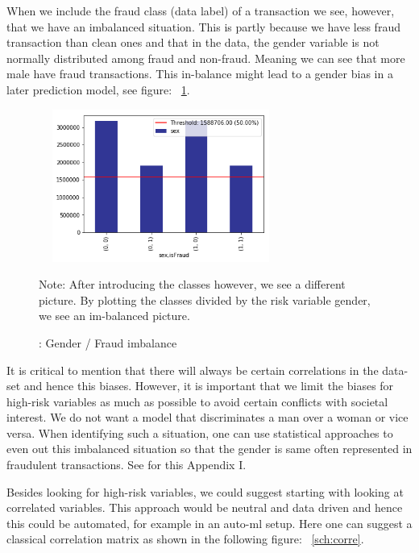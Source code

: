 \documentclass[jou,apacite]{apa6}
\begin{document}
When we include the fraud class (data label) of a transaction we see, however, that we have an imbalanced situation. This is partly because we have less fraud transaction than clean ones and that in the data, the gender variable is not normally distributed among fraud and non-fraud. Meaning we can see that more male have fraud transactions. This in-balance might lead to a gender bias in a later prediction model, see figure: ~\ref{sch:genderim}.

\begin{figure}[htb!]
  \includegraphics[width=8cm, height=5cm]{rebalancegenderfraud.png}
  \caption{: Gender / Fraud imbalance}
  \medskip %
  \begin{minipage}{0.45\textwidth} %
  {\footnotesize Note: After introducing the classes however, we see a different  picture. By plotting the classes divided by the risk variable gender, we see an im-balanced picture.\par}
  \end{minipage}
  \label{sch:genderim}
\end{figure}

It is critical to mention that there will always be certain correlations in the data-set and hence this biases. However, it is important that we limit the biases for high-risk variables as much as possible to avoid certain conflicts with societal interest. We do not want a model that discriminates a man over a woman or vice versa. When identifying such a situation, one can use statistical approaches to even out this imbalanced situation so that the gender is same often represented in fraudulent transactions. See for this Appendix I.\par

Besides looking for high-risk variables, we could suggest starting with looking at correlated variables. This approach would be neutral and data driven and hence this could be automated, for example in an auto-ml setup. Here one can suggest a classical correlation matrix as shown in the following figure: ~\ref{sch:corre}.
\end{document}
